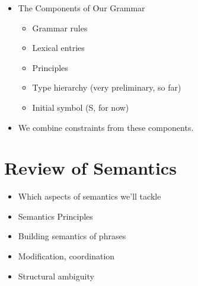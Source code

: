 \documentclass[a4paper,landscape,headrule,footrule]{foils}
\begin{document}
\begin{itemize}
\item The Components of Our Grammar
\begin{itemize}
\item Grammar rules
\item Lexical entries
\item Principles
\item Type hierarchy (very preliminary, so far)
\item Initial symbol (S, for now)
\end{itemize}
\item We combine constraints from these components.
\end{itemize}

\section{Review of Semantics}

\begin{itemize}
\item Which aspects of semantics we’ll tackle
\item Semantics Principles
\item Building semantics of phrases
\item Modification, coordination
\item Structural ambiguity
\end{itemize}


\end{document}
